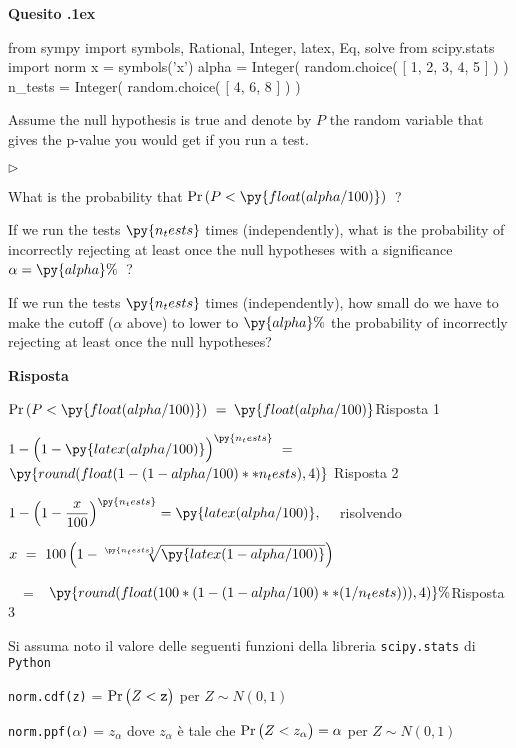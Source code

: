 \documentclass[11pt,twoside,a4paper]{article}
\newcommand{\mylabel}[1]{#1\hfill}
\renewenvironment{itemize}
  {\begin{list}{$\triangleright$}{%
   \setlength{\parskip}{0mm}
   \setlength{\topsep}{.4\baselineskip}
   \setlength{\rightmargin}{0mm}
   \setlength{\listparindent}{0mm}
   \setlength{\itemindent}{0mm}
   \setlength{\labelwidth}{2ex}
   \setlength{\itemsep}{.4\baselineskip}
   \setlength{\parsep}{0mm}
   \setlength{\partopsep}{0mm}
   \setlength{\labelsep}{1ex}
   \setlength{\leftmargin}{\labelwidth+\labelsep}
   \let\makelabel\mylabel}}{%
   \end{list}\vspace*{-1.3mm}}
\def\Pr{{\rm Pr\,}}
\newcounter{quesito}
\newenvironment{question}{\bigskip\addtocounter{quesito}{1}\par\textbf{Quesito \thequesito.\kern1ex}}{\vspace{\parskip}}
\newenvironment{answer}{\par\textbf{Risposta\quad}}{\vspace{\parskip}}
\begin{document}
\begin{question} %
\begin{pycode}
from sympy import symbols, Rational, Integer, latex, Eq, solve
from scipy.stats import norm
x = symbols('x')
alpha = Integer( random.choice( [ 1, 2, 3, 4, 5 ] ) )
n_tests = Integer( random.choice( [ 4, 6, 8 ] ) )
\end{pycode}
Assume the null hypothesis is true and denote by $P$ the random variable that gives the p-value you would get if you run a test.

\begin{itemize}
\item[1.] What is the probability that $\Pr(P<\py{float(alpha/100) })$~?

\item[2.] If we run the tests $\py{n_tests}$ times (independently), what is the probability of incorrectly rejecting at least once the null hypotheses with a significance $\alpha=\py{alpha}\%$~?

\item[3.] If we run the tests $\py{n_tests}$ times (independently), how small do we have to make the cutoff ($\alpha$ above) to lower to $\py{alpha}\%$ the probability of incorrectly rejecting at least once the null hypotheses? 
\end{itemize}

\begin{answer}

$\Pr(P<\py{float(alpha/100) })\ =\ ${\color{blue}$\py{float(alpha/100) }$\hfill Risposta 1}


$1-\Big(1-\py{latex(alpha/100) }\Big)^{\py{n_tests}}\ =\  ${\color{blue}$\py{round(float(1-(1-alpha/100)**n_tests), 4)}$ \hfill Risposta 2}

$\displaystyle 1-\Big(1-\frac{x}{100}\Big)^{\py{n_tests}}=\py{latex(alpha/100) }, \quad$ 
risolvendo 

$\displaystyle x\ =\ 100\,\Big( 1-\sqrt[\py{n_tests}]{\py{latex(1-alpha/100) } }\Big)$\medskip

$\displaystyle\phantom{x}\ =$ {\color{blue}$\kern1ex\py{round(float( 100*( 1- (1-alpha/100)**(1/n_tests) ) ), 4) }\%$\hfill Risposta 3}




\end{answer}
\end{question}



\vfill
\hrulefill

Si assuma noto il valore delle seguenti funzioni della libreria {\tt scipy.stats\/} di  {\tt Python\/}

{\tt norm.cdf(z)} = $\Pr\big(Z<{\tt z}\big)$ per $Z\sim N(0,1)$ 

{\tt norm.ppf($\alpha$)} = $z_\alpha$ dove $z_\alpha$ è tale che $\Pr\big(Z<z_\alpha\big)=\alpha$ per $Z\sim N(0,1)$ 
\end{document}

